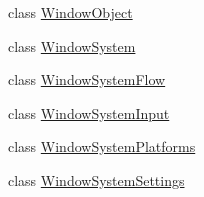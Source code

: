 \begin{DoxyCompactItemize}
\item 
class \hyperlink{class_unity_engine_1_1_u_i_1_1_windows_1_1_window_object}{Window\+Object}
\item 
class \hyperlink{class_unity_engine_1_1_u_i_1_1_windows_1_1_window_system}{Window\+System}
\item 
class \hyperlink{class_unity_engine_1_1_u_i_1_1_windows_1_1_window_system_flow}{Window\+System\+Flow}
\item 
class \hyperlink{class_unity_engine_1_1_u_i_1_1_windows_1_1_window_system_input}{Window\+System\+Input}
\item 
class \hyperlink{class_unity_engine_1_1_u_i_1_1_windows_1_1_window_system_platforms}{Window\+System\+Platforms}
\item 
class \hyperlink{class_unity_engine_1_1_u_i_1_1_windows_1_1_window_system_settings}{Window\+System\+Settings}
\end{DoxyCompactItemize}
